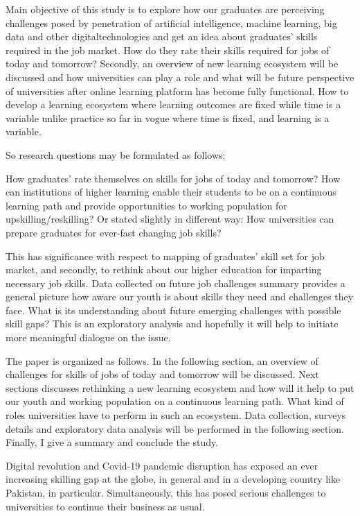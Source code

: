 \documentclass[
]{aft}
\begin{document}
Main objective of this study is to explore how our graduates are
perceiving challenges posed by penetration of artificial intelligence,
machine learning, big data and other digitaltechnologies and get an idea
about graduates' skills required in the job market. How do they rate
their skills required for jobs of today and tomorrow? Secondly, an
overview of new learning ecosystem will be discussed and how
universities can play a role and what will be future perspective of
universities after online learning platform has become fully functional.
How to develop a learning ecosystem where learning outcomes are fixed
while time is a variable unlike practice so far in vogue where time is
fixed, and learning is a variable.

So research questions may be formulated as follows:

How graduates' rate themselves on skills for jobs of today and tomorrow?
How can institutions of higher learning enable their students to be on a
continuous learning path and provide opportunities to working population
for upskilling/reskilling? Or stated slightly in different way: How
universities can prepare graduates for ever-fast changing job skills?

This has significance with respect to mapping of graduates' skill set
for job market, and secondly, to rethink about our higher education for
imparting necessary job skills. Data collected on future job challenges
summary provides a general picture how aware our youth is about skills
they need and challenges they face. What is its understanding about
future emerging challenges with possible skill gaps? This is an
exploratory analysis and hopefully it will help to initiate more
meaningful dialogue on the issue.

The paper is organized as follows. In the following section, an overview
of challenges for skills of jobs of today and tomorrow will be
discussed. Next sections discusses rethinking a new learning ecosystem
and how will it help to put our youth and working population on a
continuous learning path. What kind of roles universities have to
perform in such an ecosystem. Data collection, surveys details and
exploratory data analysis will be performed in the following section.
Finally, I give a summary and conclude the study.

Digital revolution and Covid-19 pandemic disruption has exposed an ever
increasing skilling gap at the globe, in general and in a developing
country like Pakistan, in particular. Simultaneously, this has posed
serious challenges to universities to continue their business as usual.
\end{document}
